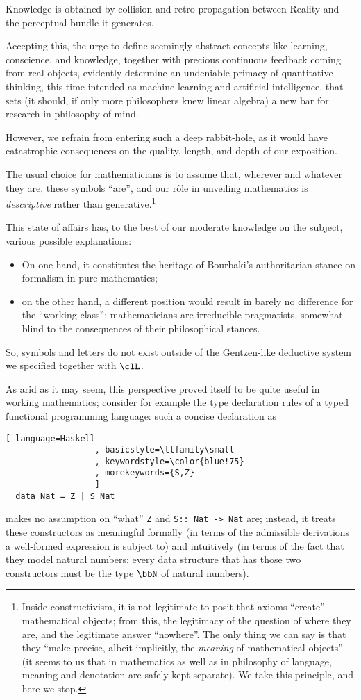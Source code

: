 Knowledge is obtained by collision and retro-propagation between Reality and the perceptual bundle it generates.

Accepting this, the urge to define seemingly abstract concepts like learning, conscience, and knowledge, together with precious continuous feedback coming from real objects, evidently determine an undeniable primacy of quantitative thinking, this time intended as machine learning and artificial intelligence, that sets (it should, if only more philosophers knew linear algebra) a new bar for research in philosophy of mind.

However, we refrain from entering such a deep rabbit-hole, as it would have catastrophic consequences on the quality, length, and depth of our exposition.

The usual choice for mathematicians is to assume that, wherever and whatever they are, these symbols ``are'', and our r\^ole in unveiling mathematics is \emph{descriptive} rather than generative.\footnote{Inside constructivism, it is not legitimate to posit that axioms ``create'' mathematical objects; from this, the legitimacy of the question of where they are, and the legitimate answer ``nowhere''. The only thing we can say is that they ``make precise, albeit implicitly, the \emph{meaning} of mathematical objects'' \cite[]{agazzi} (it seems to us that in mathematics as well as in philosophy of language, meaning and denotation are safely kept separate). We take this principle, and here we stop.}

This state of affairs has, to the best of our moderate knowledge on the subject, various possible explanations:
\begin{itemize}
	\item On one hand, it constitutes the heritage of Bourbaki's authoritarian stance on formalism in pure mathematics;
	\item on the other hand, a different position would result in barely no difference for the ``working class''; mathematicians are irreducible pragmatists, somewhat blind to the consequences of their philosophical stances.
\end{itemize}
So, symbols and letters do not exist outside of the Gentzen-like deductive system we specified together with $\clL$.

As arid as it may seem, this perspective proved itself to be quite useful in working mathematics; consider for example the type declaration rules of a typed functional programming language: such a concise declaration as
\begin{lstlisting}[ language=Haskell
                  , basicstyle=\ttfamily\small
                  , keywordstyle=\color{blue!75}
                  , morekeywords={S,Z}
                  ]
  data Nat = Z | S Nat
\end{lstlisting}
makes no assumption on ``what'' \verb|Z| and \verb|S:: Nat -> Nat| are; instead, it treats these constructors as meaningful formally (in terms of the admissible derivations a well-formed expression is subject to) and intuitively (in terms of the fact that they model natural numbers: every data structure that has those two constructors must be the type $\bbN$ of natural numbers).


